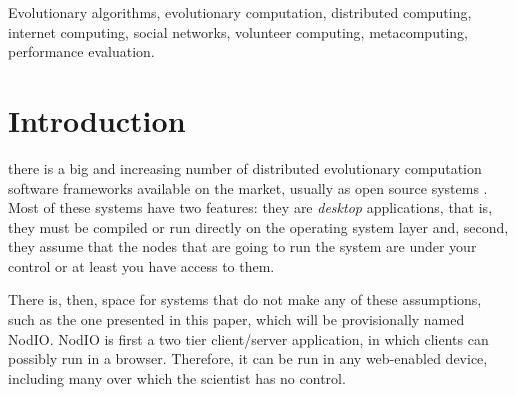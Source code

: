 \documentclass[journal,onecolumn]{IEEEtran}
\begin{document}



\begin{IEEEkeywords}
Evolutionary algorithms, evolutionary computation, distributed computing, internet computing,
social networks, volunteer computing, metacomputing, performance evaluation.
\end{IEEEkeywords}

\section{Introduction}

 there is a big and increasing number of
distributed evolutionary computation software frameworks available on
the market, usually as open source systems \cite{Parejo12Survey}. Most of these systems have 
two features: they are {\em desktop} applications, that is, they must
be compiled or run directly on the operating system layer and, second,
they assume that the nodes that are going to run the system are under
your control or at least you have access to them.

There is, then, space for systems that do not make any of these
assumptions, such as the one presented in this paper, which will be
provisionally named {\sf NodIO}. {\sf NodIO} is first a two tier client/server 
application, in which clients can possibly run in a browser. 
Therefore, it can be run in any web-enabled device, including many over which 
the scientist has no control.
\end{document}
